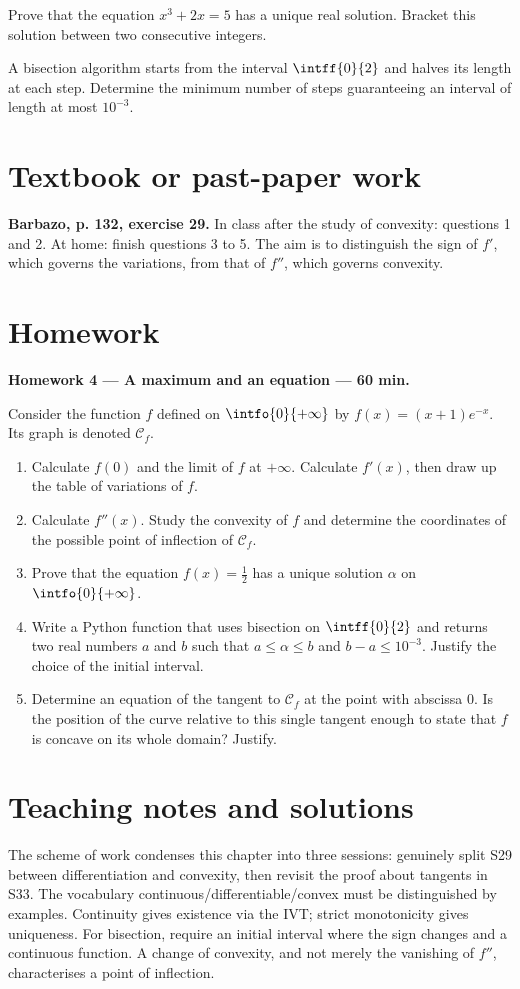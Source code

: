 Prove that the equation $x^3+2x=5$ has a unique real solution. Bracket this solution between two consecutive integers.

A bisection algorithm starts from the interval $\intff{0}{2}$ and halves its length at each step. Determine the minimum number of steps guaranteeing an interval of length at most $10^{-3}$.

\section{Textbook or past-paper work}\textbf{Barbazo, p. 132, exercise 29.} In class after the study of convexity: questions 1 and 2. At home: finish questions 3 to 5. The aim is to distinguish the sign of $f'$, which governs the variations, from that of $f''$, which governs convexity.

\mxnewpage
\section{Homework}\textbf{Homework 4 --- A maximum and an equation --- 60 min.}\par Consider the function $f$ defined on $\intfo{0}{+\infty}$ by $f(x)=(x+1)e^{-x}$. Its graph is denoted $\mathcal C_f$.
\begin{enumerate}\item Calculate $f(0)$ and the limit of $f$ at $+\infty$. Calculate $f' (x)$, then draw up the table of variations of $f$.
\item Calculate $f'' (x)$. Study the convexity of $f$ and determine the coordinates of the possible point of inflection of $\mathcal C_f$.
\item Prove that the equation $f(x)=\frac12$ has a unique solution $\alpha$ on $\intfo{0}{+\infty}$.
\item Write a Python function that uses bisection on $\intff{0}{2}$ and returns two real numbers $a$ and $b$ such that $a\le\alpha\le b$ and $b-a\le10^{-3}$. Justify the choice of the initial interval.
\item Determine an equation of the tangent to $\mathcal C_f$ at the point with abscissa $0$. Is the position of the curve relative to this single tangent enough to state that $f$ is concave on its whole domain? Justify.\end{enumerate}

\ifmxteacher\mxnewpage\section{Teaching notes and solutions}\begin{teachernote}The scheme of work condenses this chapter into three sessions: genuinely split S29 between differentiation and convexity, then revisit the proof about tangents in S33. The vocabulary continuous/differentiable/convex must be distinguished by examples. Continuity gives existence via the IVT; strict monotonicity gives uniqueness. For bisection, require an initial interval where the sign changes and a continuous function. A change of convexity, and not merely the vanishing of $f''$, characterises a point of inflection.\end{teachernote}

